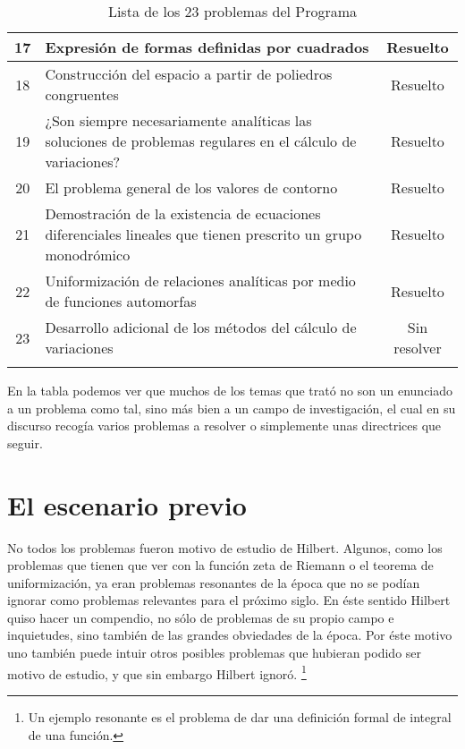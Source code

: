 \begin{longtable}{|c|p{7cm}|c|}
    17 & Expresión de formas definidas por cuadrados & Resuelto \\ \midrule
    18 & Construcción del espacio a partir de poliedros congruentes & Resuelto \\ \midrule
    19 & ¿Son siempre necesariamente analíticas las soluciones de 
        problemas regulares en el cálculo de variaciones? & Resuelto \\ \midrule
    20 & El problema general de los valores de contorno & Resuelto \\ \midrule
    21 & Demostración de la existencia de ecuaciones diferenciales
        lineales que tienen prescrito un grupo monodrómico & Resuelto \\ \midrule
    22 & Uniformización de relaciones analíticas 
        por medio de funciones automorfas & Resuelto \\ \midrule
    23 & Desarrollo adicional de los métodos del cálculo de variaciones & Sin resolver \\ \bottomrule
  \caption{Lista de los 23 problemas del Programa}
  \label{tb:programa}
\end{longtable}

En la tabla podemos ver que muchos de los temas que trató no son un enunciado a un problema como tal, sino más bien a un campo de investigación, el cual en su 
discurso recogía varios problemas a resolver o simplemente unas directrices que seguir.



\section{El escenario previo}

No todos los problemas fueron motivo de estudio de Hilbert. Algunos, como los problemas que tienen que ver con la función zeta de Riemann o el teorema de uniformización,
ya eran problemas resonantes de la época que no se podían ignorar como problemas relevantes para el próximo siglo. En éste sentido Hilbert quiso hacer un compendio, 
no sólo de problemas de su propio campo e inquietudes, sino también de las grandes obviedades de la época. Por éste motivo uno también puede intuir otros posibles problemas
que hubieran podido ser motivo de estudio, y que sin embargo Hilbert ignoró. \footnote{Un ejemplo resonante es el problema de dar una definición formal de integral de una función.}

